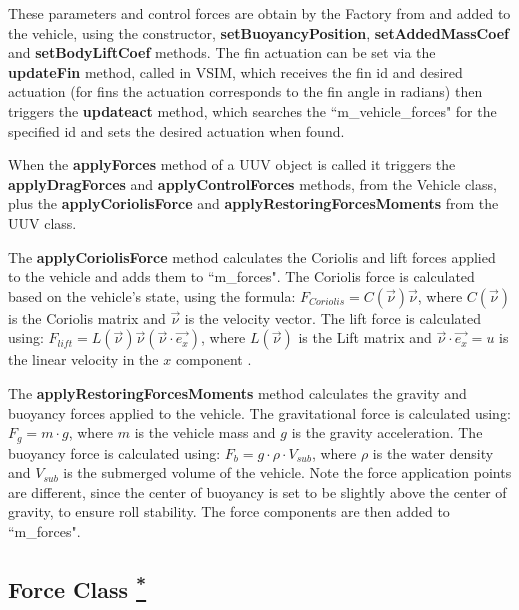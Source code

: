 \documentclass[10pt,a4paper]{article}
\begin{document}
\par These parameters and control forces are obtain by the Factory from  and added to the vehicle, using the constructor, \textbf{setBuoyancyPosition}, \textbf{setAddedMassCoef} and \textbf{setBodyLiftCoef} methods. The fin actuation can be set via the \textbf{updateFin} method, called in VSIM, which receives the fin id and desired actuation (for fins the actuation corresponds to the fin angle in radians) then triggers the \textbf{updateact} method, which searches the ``m\_vehicle\_forces" for the specified id and sets the desired actuation when found.

\par When the \textbf{applyForces} method of a UUV object is called it triggers the \textbf{applyDragForces} and \textbf{applyControlForces} methods, from the Vehicle class, plus the \textbf{applyCoriolisForce} and \textbf{applyRestoringForcesMoments} from the UUV class.

\par The \textbf{applyCoriolisForce} method calculates the Coriolis and lift forces applied to the vehicle and adds them to ``m\_forces". The Coriolis force is calculated based on the vehicle's state, using the formula: $F_{Coriolis} = C\left(\vec{\nu}\right) \vec{\nu}$, where $C\left(\vec{\nu}\right)$ is the Coriolis matrix and  $\vec{\nu}$ is the velocity vector. The lift force is calculated using: $F_{lift} = L\left(\vec{\nu}\right) \vec{\nu} \left(\vec{\nu}\cdot \vec{e_x}\right)$, where $L\left(\vec{\nu}\right)$ is the Lift matrix and  $\vec{\nu}\cdot \vec{e_x} = u$ is the linear velocity in the $x$ component \cite{braga}.

\par The \textbf{applyRestoringForcesMoments} method calculates the gravity and buoyancy forces applied to the vehicle. The gravitational force is calculated using: $F_{g} = m\cdot g$, where $m$ is the vehicle mass and $g$ is the gravity acceleration. The buoyancy force is calculated using: $F_{b}=g\cdot \rho \cdot V_{sub}$, where $\rho$ is the water density and $V_{sub}$ is the submerged volume of the vehicle. Note the force application points are different, since the center of buoyancy is set to be slightly above the center of gravity, to ensure roll stability. The force components are then added to ``m\_forces".

\subsection{Force Class \href{https://www.lsts.pt/docs/dune/dune-2017.01.0-dmsmw/d0/d49/classSimulators_1_1VSIM_1_1Force.html}{\textsuperscript{*}}}
\label{force_class}
\end{document}
